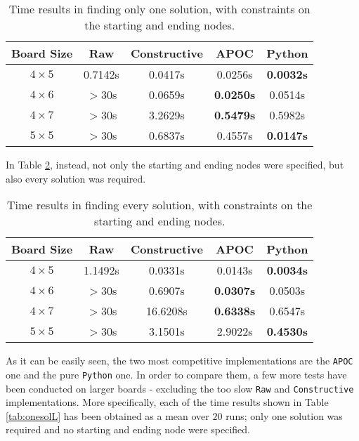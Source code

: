 \documentclass[conference]{IEEEtran}
\begin{document}
\begin{table}[ht]
\centering
\begin{tabular}{|c|c c c c |}
\hline
\textbf{Board Size} & \textbf{Raw} & \textbf{Constructive} & \textbf{APOC} & \textbf{Python} \\ \hline
\textbf{$4 \times 5$} & 0.7142s & 0.0417s & 0.0256s & \textbf{0.0032s}  \\ \hline
\textbf{$4 \times 6$} & $>$30s & 0.0659s & \textbf{0.0250s} & 0.0514s \\ \hline
\textbf{$4 \times 7$} & $>$30s & 3.2629s & \textbf{0.5479s} & 0.5982s \\ \hline
\textbf{$5 \times 5$} & $>$30s & 0.6837s & 0.4557s & \textbf{0.0147s} \\ \hline
\end{tabular}
\caption{Time results in finding only one solution, with constraints on the starting and ending nodes.}
\label{tab:onesolcon}
\end{table}

In Table \ref{tab:solscon}, instead, not only the starting and ending nodes were specified, but also every solution was required.

\begin{table}[ht]
\centering
\begin{tabular}{|c|c c c c |}
\hline
\textbf{Board Size} & \textbf{Raw} & \textbf{Constructive} & \textbf{APOC} & \textbf{Python} \\ \hline
\textbf{$4 \times 5$} & 1.1492s & 0.0331s & 0.0143s & \textbf{0.0034s} \\ \hline
\textbf{$4 \times 6$} & $>$30s & 0.6907s & \textbf{0.0307s} & 0.0503s \\ \hline
\textbf{$4 \times 7$} & $>$30s & 16.6208s & \textbf{0.6338s} & 0.6547s \\ \hline
\textbf{$5 \times 5$} & $>$30s & 3.1501s & 2.9022s & \textbf{0.4530s} \\ \hline
\end{tabular}
\caption{Time results in finding every solution, with constraints on the starting and ending nodes.}
\label{tab:solscon}
\end{table}

As it can be easily seen, the two most competitive implementations are the \texttt{APOC} one and the pure \texttt{Python} one.
In order to compare them, a few more tests have been conducted on larger boards - excluding the too slow \texttt{Raw} and \texttt{Constructive} implementations.
More specifically, each of the time results shown in Table \ref{tab:onesolL} has been obtained as a mean over $20$ runs; only one solution was required and no starting and ending node were specified.
\end{document}

